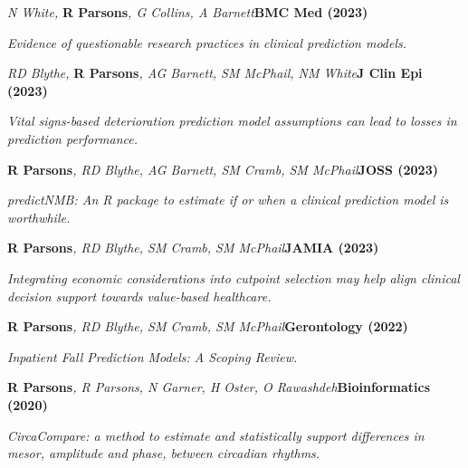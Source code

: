 \item
    \textit{N White, }\textbf{R Parsons}\textit{, G Collins, A Barnett}\textbf{\hfill{BMC Med (2023)}}\par
    \textit{Evidence of questionable research practices in clinical prediction models.}
\item
    \textit{RD Blythe, }\textbf{R Parsons}\textit{, AG Barnett, SM McPhail, NM White}\textbf{\hfill{J Clin Epi (2023)}}\par
    \textit{Vital signs-based deterioration prediction model assumptions can lead to losses in prediction performance.}
\item
    \textbf{R Parsons}\textit{, RD Blythe, AG Barnett, SM Cramb, SM McPhail}\textbf{\hfill{JOSS (2023)}}\par
    \textit{predictNMB: An R package to estimate if or when a clinical prediction model is worthwhile.}
\item
    \textbf{R Parsons}\textit{, RD Blythe, SM Cramb, SM McPhail}\textbf{\hfill{JAMIA (2023)}}\par
    \textit{Integrating economic considerations into cutpoint selection may help align clinical decision support towards value-based healthcare.}
\item
    \textbf{R Parsons}\textit{, RD Blythe, SM Cramb, SM McPhail}\textbf{\hfill Gerontology (2022)}\par
	\textit{Inpatient Fall Prediction Models: A Scoping Review.}
\item
    \textbf{R Parsons}\textit{, R Parsons, N Garner, H Oster, O Rawashdeh}\textbf{\hfill Bioinformatics (2020)}\par 
    \textit{CircaCompare: a method to estimate and statistically support differences in mesor, amplitude and phase, between circadian rhythms.}
